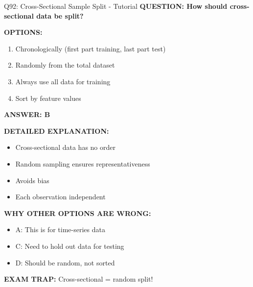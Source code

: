 \documentclass[8pt]{beamer}
\begin{document}
	\begin{frame}{Q92: Cross-Sectional Sample Split - Tutorial}
		\fontsize{6.5}{7.5}\selectfont
		\textbf{QUESTION: How should cross-sectional data be split?}
		
		\vspace{0.1cm}
		\textbf{OPTIONS:}
		\begin{enumerate}
			\item Chronologically (first part training, last part test)
			\item Randomly from the total dataset
			\item Always use all data for training
			\item Sort by feature values
		\end{enumerate}
		
		\vspace{0.1cm}
		\textcolor{myblue}{\textbf{ANSWER: B}}
		
		\vspace{0.1cm}
		\textbf{DETAILED EXPLANATION:}
		\begin{itemize}
			\item Cross-sectional data has no order
			\item Random sampling ensures representativeness
			\item Avoids bias
			\item Each observation independent
		\end{itemize}
		
		\vspace{0.1cm}
		\textcolor{myred}{\textbf{WHY OTHER OPTIONS ARE WRONG:}}
		\begin{itemize}
			\item \textcolor{myred}{A:} This is for time-series data
			\item \textcolor{myred}{C:} Need to hold out data for testing
			\item \textcolor{myred}{D:} Should be random, not sorted
		\end{itemize}
		
		\textcolor{myred}{\textbf{EXAM TRAP:}} Cross-sectional = \textcolor{myblue}{random split}!
	\end{frame}
	
\end{document}
